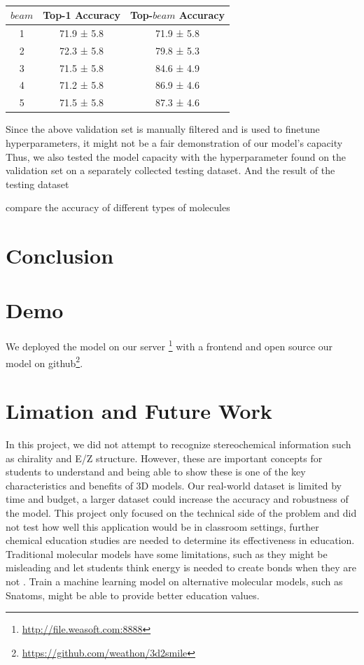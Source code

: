 \documentclass{article}
\begin{document}
\begin{table}[]
    \centering
    \begin{tabular}{c|cc}
      $beam$ & Top-1 Accuracy & Top-$beam$ Accuracy \\ \hline
      1 & 71.9 ± 5.8 & 71.9 ± 5.8 \\ 2 & 72.3 ± 5.8 & 79.8 ± 5.3 \\ 3 & 71.5 ± 5.8 & 84.6 ± 4.9 \\ 4 & 71.2 ± 5.8 & 86.9 ± 4.6 \\ 5 & 71.5 ± 5.8 & 87.3 ± 4.6
    \end{tabular}
    \caption{}
    \label{tab:my_label}
\end{table}

Since the above validation set is manually filtered and is used to finetune hyperparameters, it might not be a fair demonstration of our model's capacity Thus, we also tested the model capacity with the hyperparameter found on the validation set on a separately collected testing dataset. And the result of the testing dataset 

compare the accuracy of different types of molecules
\section{Conclusion}
\section{Demo}
We deployed the model on our server \footnote{\url{http://file.weasoft.com:8888}} with a frontend and open source our model on github\footnote{\url{https://github.com/weathon/3d2smile}}. 
\section{Limation and Future Work}
In this project, we did not attempt to recognize stereochemical information such as chirality and E/Z structure. However, these are important concepts for students to understand and being able to show these is one of the key characteristics and benefits of 3D models. 
Our real-world dataset is limited by time and budget, a larger dataset could increase the accuracy and robustness of the model. 
This project only focused on the technical side of the problem and did not test how well this application would be in classroom settings, further chemical education studies are needed to determine its effectiveness in education. 
Traditional molecular models have some limitations, such as they might be misleading and let students think energy is needed to create bonds when they are not \autocite{snatoms}. Train a machine learning model on alternative molecular models, such as Snatoms\autocite{snatoms}, might be able to provide better education values.
\end{document}
